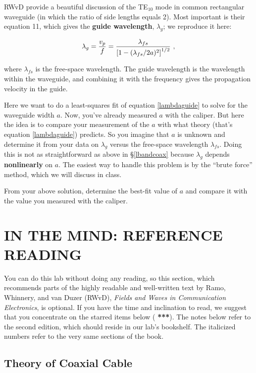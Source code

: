 \documentclass[12pt,preprint]{aastex}
\begin{document}
	RWvD provide a beautiful discussion of the TE$_{10}$ mode in
common rectangular waveguide (in which the ratio of side lengths equals
2).  Most important is their equation 11, which gives the {\bf guide
wavelength}, $\lambda_g$; we reproduce it here:

\begin{equation} \label{lambdaguide}
\lambda_g = {v_p \over f} = {\lambda_{fs} \over \left[ 1 - (\lambda_{fs}/2a)^2
\right]^{1/2} } \ ,
\end{equation}

\noindent where $\lambda_{fs}$ is the free-space wavelength.  The guide
wavelength is the wavelength within the waveguide, and combining it with
the frequency gives the propagation velocity in the guide. 

Here we want to do a least-squares fit of equation \ref{lambdaguide} to
solve for the waveguide width $a$. Now, you've already measured $a$ with
the caliper. But here the idea is to compare your measurement of the
$a$ with what theory (that's equation \ref{lambdaguide})
predicts. So you imagine that $a$ is unknown and determine it from your
data on $\lambda_g$ versus the free-space wavelength $\lambda_{fs}$.
Doing this is not as straightforward as above in \S \ref{lbandcoax}
because $\lambda_g$ depends {\bf nonlinearly} on $a$. The easiest way to
handle
this problem is by the ``brute force'' method, which we will discuss in
class. 

	From your above solution, determine the best-fit value of $a$
and compare it with the value you measured with the caliper.

\section {IN THE MIND: REFERENCE READING} \label{RWvD}

You can do this lab without doing any reading, so this section, which
recommends parts of the highly readable and well-written text by Ramo,
Whinnery, and van Duzer (RWvD), {\it Fields and Waves in Communication
  Electronics}, is optional. If you have the time and inclination to
read, we suggest that you concentrate on the starred items below ({\bf
  ***}).  The notes below refer to the second edition, which should
reside in our lab's bookshelf. The italicized numbers refer to the very
same sections of the book.

\subsection{ Theory of Coaxial Cable}
	
\end{document}
